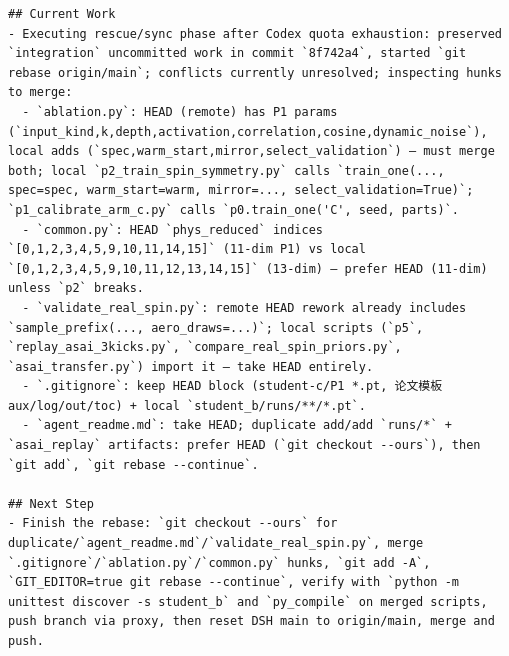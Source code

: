\documentclass[UTF8,10pt]{ctexart}
\begin{document}
\begin{Verbatim}[breaklines=true,breakanywhere=true,fontsize=\scriptsize,frame=single,framesep=2pt]
## Current Work
- Executing rescue/sync phase after Codex quota exhaustion: preserved `integration` uncommitted work in commit `8f742a4`, started `git rebase origin/main`; conflicts currently unresolved; inspecting hunks to merge:
  - `ablation.py`: HEAD (remote) has P1 params (`input_kind,k,depth,activation,correlation,cosine,dynamic_noise`), local adds (`spec,warm_start,mirror,select_validation`) — must merge both; local `p2_train_spin_symmetry.py` calls `train_one(..., spec=spec, warm_start=warm, mirror=..., select_validation=True)`; `p1_calibrate_arm_c.py` calls `p0.train_one('C', seed, parts)`.
  - `common.py`: HEAD `phys_reduced` indices `[0,1,2,3,4,5,9,10,11,14,15]` (11-dim P1) vs local `[0,1,2,3,4,5,9,10,11,12,13,14,15]` (13-dim) — prefer HEAD (11-dim) unless `p2` breaks.
  - `validate_real_spin.py`: remote HEAD rework already includes `sample_prefix(..., aero_draws=...)`; local scripts (`p5`, `replay_asai_3kicks.py`, `compare_real_spin_priors.py`, `asai_transfer.py`) import it — take HEAD entirely.
  - `.gitignore`: keep HEAD block (student-c/P1 *.pt, 论文模板 aux/log/out/toc) + local `student_b/runs/**/*.pt`.
  - `agent_readme.md`: take HEAD; duplicate add/add `runs/*` + `asai_replay` artifacts: prefer HEAD (`git checkout --ours`), then `git add`, `git rebase --continue`.

## Next Step
- Finish the rebase: `git checkout --ours` for duplicate/`agent_readme.md`/`validate_real_spin.py`, merge `.gitignore`/`ablation.py`/`common.py` hunks, `git add -A`, `GIT_EDITOR=true git rebase --continue`, verify with `python -m unittest discover -s student_b` and `py_compile` on merged scripts, push branch via proxy, then reset DSH main to origin/main, merge and push.


\end{Verbatim}
\end{document}
